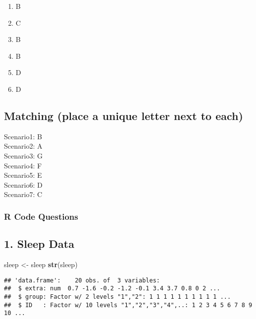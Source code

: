 \documentclass[]{article}
\newenvironment{Shaded}{\begin{snugshade}}{\end{snugshade}}
\newcommand{\KeywordTok}[1]{\textcolor[rgb]{0.13,0.29,0.53}{\textbf{#1}}}
\newcommand{\NormalTok}[1]{#1}
\newcommand{\StringTok}[1]{\textcolor[rgb]{0.31,0.60,0.02}{#1}}
\providecommand{\tightlist}{%
  \setlength{\itemsep}{0pt}\setlength{\parskip}{0pt}}
\begin{document}
\begin{enumerate}
\def\labelenumi{\arabic{enumi}.}
\setcounter{enumi}{7}
\tightlist
\item
  B
\item
  C
\item
  B
\item
  B
\item
  D
\item
  D
\end{enumerate}

\hypertarget{matching-place-a-unique-letter-next-to-each}{%
\subsection{Matching (place a unique letter next to
each)}\label{matching-place-a-unique-letter-next-to-each}}

Scenario1: B\\
Scenario2: A\\
Scenario3: G\\
Scenario4: F\\
Scenario5: E\\
Scenario6: D\\
Scenario7: C

\newpage

\hypertarget{r-code-questions}{%
\subsubsection{R Code Questions}\label{r-code-questions}}

\hypertarget{sleep-data}{%
\subsection{1. Sleep Data}\label{sleep-data}}

\begin{Shaded}
\begin{Highlighting}[]
\NormalTok{sleep <-}\StringTok{ }\NormalTok{sleep}
\KeywordTok{str}\NormalTok{(sleep)}
\end{Highlighting}
\end{Shaded}

\begin{verbatim}
## 'data.frame':    20 obs. of  3 variables:
##  $ extra: num  0.7 -1.6 -0.2 -1.2 -0.1 3.4 3.7 0.8 0 2 ...
##  $ group: Factor w/ 2 levels "1","2": 1 1 1 1 1 1 1 1 1 1 ...
##  $ ID   : Factor w/ 10 levels "1","2","3","4",..: 1 2 3 4 5 6 7 8 9 10 ...
\end{verbatim}
\end{document}
